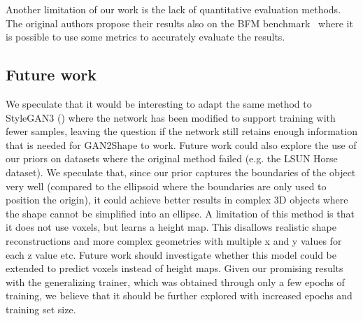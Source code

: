 Another limitation of our work is the lack of quantitative evaluation methods. The original authors propose their results also on the BFM benchmark~\cite{paysan20093d} where it is possible to use some metrics to accurately evaluate the results. 
\subsection{Future work}
We speculate that it would be interesting to adapt the same method to StyleGAN3 (\cite{stylegan3}) where the network has been modified to support training with fewer samples, leaving the question if the network still retains enough information that is needed for GAN2Shape to work. Future work could also explore the use of our priors on datasets where the original method failed (e.g. the LSUN Horse dataset). We speculate that, since our prior captures the boundaries of the object very well (compared to the ellipsoid where the boundaries are only used to position the origin), it could achieve better results in complex 3D objects where the shape cannot be simplified into an ellipse. A limitation of this method is that it does not use voxels, but learns a height map. This disallows realistic shape reconstructions and more complex geometries with multiple x and y values for each z value etc. Future work should investigate whether this model could be extended to predict voxels instead of height maps. Given our promising results with the generalizing trainer, which was obtained through only a few epochs of training, we believe that it should be further explored with increased epochs and training set size.


